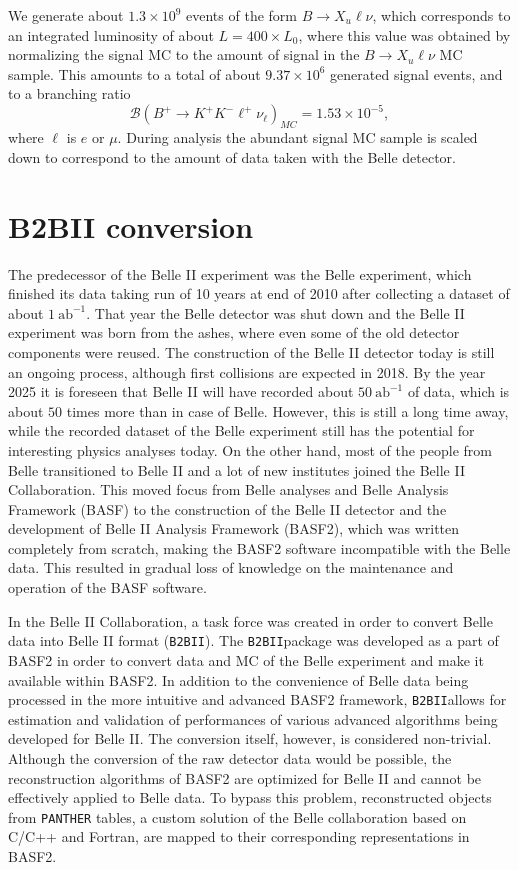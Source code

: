 \documentclass[headings=standardclasses,headings=big,oneside,a4paper,openany,12pt]{scrbook}
\newcommand {\e}[1]{\mathrm{~#1}}
\newcommand {\E}[1]{\times 10^{#1}}
\newcommand {\btbii}{\texttt{B2BII}}
\begin{document}
We generate about $1.3\E{9}$ events of the form $B\to X_u \ell \nu$, which corresponds to an integrated luminosity of about $L = 400\times L_0$, where this value was obtained by normalizing the signal MC to the amount of signal in the $B\to X_u \ell \nu$ MC sample. This amounts to a total of about $9.37\E{6}$ generated signal events, and to a branching ratio
\begin{equation}
\mathcal{B}\left(B^+ \to K^+ K^- \ell^+ \nu_\ell\right)_{MC} = 1.53\E{-5},
\end{equation}
where $\ell$ is $e$ or $\mu$. During analysis the abundant signal MC sample is scaled down to correspond to the amount of data taken with the Belle detector.

\chapter{B2BII conversion}

The predecessor of the Belle II experiment was the Belle experiment, which finished its data taking run of 10 years at end of 2010 after collecting a dataset of about $1\e{ab^{-1}}$. That year the Belle detector was shut down and the Belle II experiment was born from the ashes, where even some of the old detector components were reused. The construction of the Belle II detector today is still an ongoing process, although first collisions are expected in 2018. By the year 2025 it is foreseen that Belle II will have recorded about $50\e{ab^{-1}}$ of data, which is about $50$ times more than in case of Belle. However, this is still a long time away, while the recorded dataset of the Belle experiment still has the potential for interesting physics analyses today. On the other hand, most of the people from Belle transitioned to Belle II and a lot of new institutes joined the Belle II Collaboration. This moved focus from Belle analyses and Belle Analysis Framework (BASF) to the construction of the Belle II detector and the development of Belle II Analysis Framework (BASF2), which was written completely from scratch, making the BASF2 software incompatible with the Belle data. This resulted in gradual loss of knowledge on the maintenance and operation of the BASF software.

In the Belle II Collaboration, a task force was created in order to convert Belle data into Belle II format (\btbii). The \btbii package was developed as a part of BASF2 in order to convert data and MC of the Belle experiment and make it available within BASF2. In addition to the convenience of Belle data being processed in the more intuitive and advanced BASF2 framework, \btbii allows for estimation and validation of performances of various advanced algorithms being developed for Belle II. The conversion itself, however, is considered non-trivial. Although the conversion of the raw detector data would be possible, the reconstruction algorithms of BASF2 are optimized for Belle II and cannot be effectively applied to Belle data. To bypass this problem, reconstructed objects from \texttt{PANTHER} tables, a custom solution of the Belle collaboration based on C/C++ and Fortran, are mapped to their corresponding representations in BASF2.
\end{document}
